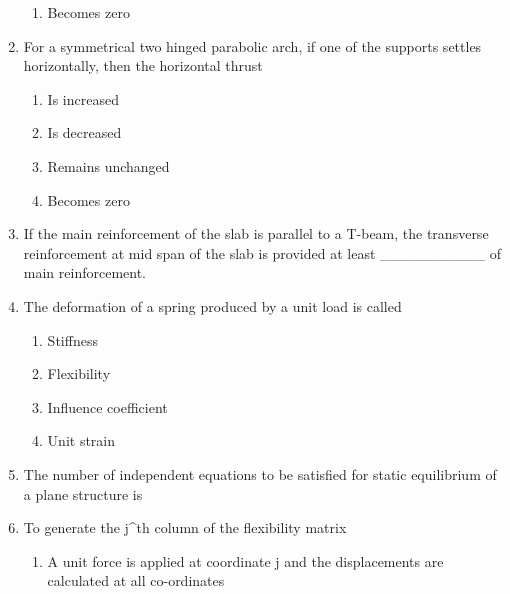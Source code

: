\documentclass[11pt,a4paper]{article}
\begin{document}
\begin{enumerate}
\begin{enumerate}[label=\Alph*.]
\item{Becomes zero}
\end{enumerate}
\item{For a symmetrical two hinged parabolic arch, if one of the supports settles horizontally, then the horizontal thrust}
\begin{enumerate}[label=\Alph*.]
\item{Is increased}
\item{Is decreased}
\item{Remains unchanged}
\item{Becomes zero}
\end{enumerate}
\item{If the main reinforcement of the slab is parallel to a T-beam, the transverse reinforcement at mid span of the slab is provided at least \_\_\_\_\_\_\_\_\_\_ of main reinforcement.}
\\
\item{The deformation of a spring produced by a unit load is called}
\begin{enumerate}[label=\Alph*.]
\item{Stiffness}
\item{Flexibility}
\item{Influence coefficient}
\item{Unit strain}
\end{enumerate}
\item{The number of independent equations to be satisfied for static equilibrium of a plane structure is}
\\
\item{To generate the j\^{}th column of the flexibility matrix}
\begin{enumerate}[label=\Alph*.]
\item{A unit force is applied at coordinate j and the displacements are calculated at all co-ordinates}

\end{enumerate}
\end{enumerate}
\end{document}
